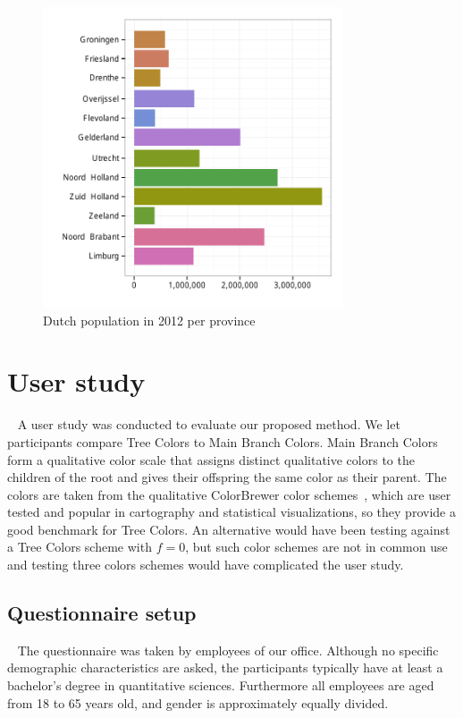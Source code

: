 \documentclass[journal]{vgtc}                %
\begin{document}
\begin{figure}[!b]
  \centering
  \includegraphics[width=3.5in]{pop_bar.pdf}

  \caption{Dutch population in 2012 per province}\label{fig:barApp}

\end{figure}



\section{User study}~\label{secuser}
A user study was conducted to evaluate our proposed method. We let participants compare Tree Colors to Main Branch Colors. Main Branch Colors form a qualitative color scale that assigns distinct qualitative colors to the children of the root and gives their offspring the same color as their parent. The colors are taken from the qualitative ColorBrewer color schemes~\cite{brewer03}, which are user tested and popular in cartography and statistical visualizations, so they provide a good benchmark for Tree Colors. An alternative would have been testing
against a Tree Colors scheme with $f=0$, but such color schemes are not in common 
use and testing three colors schemes would have complicated the user study.

\subsection{Questionnaire setup}~\label{secusersetup}
The questionnaire was taken by employees of our office. %
Although no specific 
demographic characteristics are asked, the participants typically have at least a bachelor's degree in 
quantitative sciences. Furthermore all employees are aged from 18 to 65 years old, and gender is 
approximately equally divided.
\end{document}
